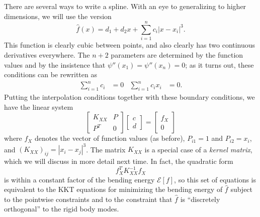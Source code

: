 \documentclass[12pt, leqno]{article} %
\begin{document}
There are several ways to write a spline.  With an eye to generalizing
to higher dimensions, we will use the version
\[
  \hat{f}(x) = d_1 + d_2 x + \sum_{i=1}^n c_i |x-x_i|^3.
\]
This function is clearly cubic between points, and also clearly has
two continuous derivatives everywhere.  The $n+2$ parameters are
determined by the function values and by the insistence that
$\psi''(x_1) = \psi''(x_n) = 0$; as it turns out, these conditions
can be rewritten as
\begin{align*}
  \sum_{i=1}^n c_i &= 0 &
  \sum_{i=1}^n c_i x_i &= 0.
\end{align*}
Putting the interpolation conditions together with these boundary
conditions, we have the linear system
\[
\begin{bmatrix}
  K_{XX} & P \\
  P^T & 0
\end{bmatrix}
\begin{bmatrix} c \\ d \end{bmatrix} =
\begin{bmatrix} f_X \\ 0 \end{bmatrix}
\]
where $f_X$ denotes the vector of function values (as before),
$P_{i1} = 1$ and $P_{i2} = x_i$, and $(K_{XX})_{ij} = |x_i-x_j|^3$.
The matrix $K_{XX}$ is a special case of a {\em kernel matrix},
which we will discuss in more detail next time.  In fact, the quadratic form
\[
  f_X^T K_{XX}^{-1} f_X
\]
is within a constant factor of the bending energy $\mathcal{E}[f]$,
so this set of equations is equivalent to the KKT equations for
minimizing the bending energy of $\hat{f}$ subject to the pointwise
constraints and to the constraint that $\hat{f}$ is ``discretely
orthogonal'' to the rigid body modes.
\end{document}
